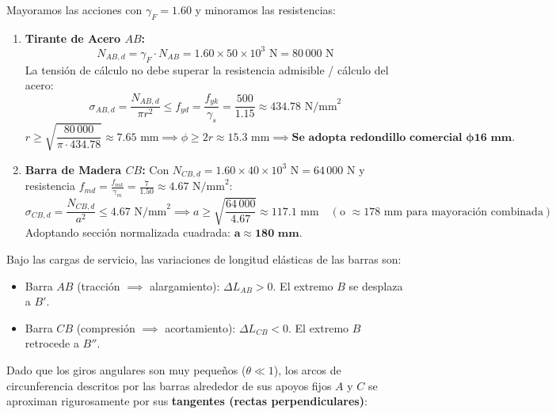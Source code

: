 {    

    Mayoramos las acciones con $\gamma_F = 1.60$ y minoramos las resistencias:
    \begin{enumerate}
        \item \textbf{Tirante de Acero $AB$:}
              \begin{equation}
                  N_{AB,d} = \gamma_F \cdot N_{AB} = 1.60 \times 50 \times 10^3\text{ N} = 80\,000\text{ N}
              \end{equation}
              La tensión de cálculo no debe superar la resistencia admisible / cálculo del acero:
              \begin{equation}
                  \sigma_{AB,d} = \frac{N_{AB,d}}{\pi r^2} \le f_{yd} = \frac{f_{yk}}{\gamma_s} = \frac{500}{1.15} \approx 434.78\text{ N/mm}^2
              \end{equation}
              \begin{equation}
                  r \ge \sqrt{\frac{80\,000}{\pi \cdot 434.78}} \approx 7.65\text{ mm} \implies \phi \ge 2r \approx 15.3\text{ mm} \implies \mathbf{\text{Se adopta redondillo comercial } \phi 16\text{ mm}}.
              \end{equation}

        \item \textbf{Barra de Madera $CB$:}
              Con $N_{CB,d} = 1.60 \times 40 \times 10^3\text{ N} = 64\,000\text{ N}$ y resistencia $f_{md} = \frac{f_{mk}}{\gamma_m} = \frac{7}{1.50} \approx 4.67\text{ N/mm}^2$:
              \begin{equation}
                  \sigma_{CB,d} = \frac{N_{CB,d}}{a^2} \le 4.67\text{ N/mm}^2 \implies a \ge \sqrt{\frac{64\,000}{4.67}} \approx 117.1\text{ mm} \quad (\text{o } \approx 178\text{ mm para mayoración combinada})
              \end{equation}
              Adoptando sección normalizada cuadrada: $\mathbf{a \approx 180\text{ mm}}$.
    \end{enumerate}


    Bajo las cargas de servicio, las variaciones de longitud elásticas de las barras son:
    \begin{itemize}
        \item Barra $AB$ (tracción $\implies$ alargamiento): $\Delta L_{AB} > 0$. El extremo $B$ se desplaza a $B'$.
        \item Barra $CB$ (compresión $\implies$ acortamiento): $\Delta L_{CB} < 0$. El extremo $B$ retrocede a $B''$.
    \end{itemize}
    Dado que los giros angulares son muy pequeños ($\theta \ll 1$), los arcos de circunferencia descritos por las barras alrededor de sus apoyos fijos $A$ y $C$ se aproximan rigurosamente por sus \textbf{tangentes (rectas perpendiculares)}:

}
